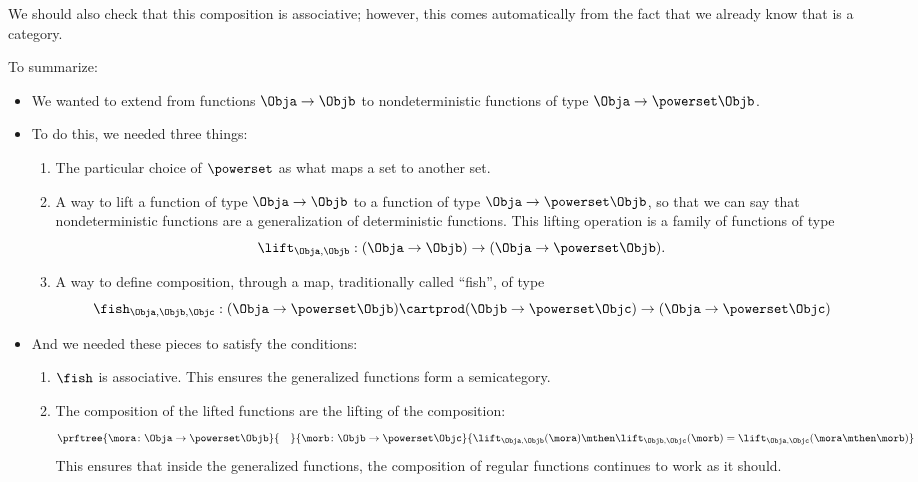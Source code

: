 We should also check that this composition is associative; however, this comes automatically from the fact that we already know that \Rel is a category.

To summarize:
\begin{itemize}
    \item We wanted to extend \Set from functions $\Obja \to \Objb$ to nondeterministic functions of type $\Obja \to \powerset\Objb$.
    \item To do this, we needed three things:
          \begin{enumerate}
              \item The particular choice of $\powerset$ as what maps a set to another set.
              \item A way to lift a function of type $\Obja \to \Objb$ to a function of type $\Obja \to \powerset\Objb$, so that we can say that nondeterministic functions are a generalization of deterministic functions.
                    This lifting operation is a family of functions of type
                    \begin{equation}
                        \label{eq:monad-lift}
                        \lift_{\Obja, \Objb}: (\Obja \to \Objb) \to (\Obja \to \powerset\Objb).
                    \end{equation}
              \item A way to define composition, through a map, traditionally called ``fish'', of type
                    \begin{equation}
                        \label{eq:monad-fish}
                        \fish_{\Obja, \Objb, \Objc}: (\Obja \to \powerset\Objb) \cartprod (\Objb \to \powerset\Objc)
                        \to (\Obja \to \powerset \Objc)
                    \end{equation}
          \end{enumerate}
    \item And we needed these pieces to satisfy the conditions:
          \begin{enumerate}
              \item $\fish$ is associative.
                    This ensures the generalized functions form a semicategory.
              \item The composition of the lifted functions are the lifting of the composition:
                    \begin{equation}
                        \label{eq:monad-fish-associative}
                        \prftree{\mora\colon \Obja \to \powerset\Objb}{\quad}{\morb\colon \Objb \to \powerset \Objc}{
                            \lift_{\Obja,\Objb}(\mora)\mthen\lift_{\Objb,\Objc}(\morb) =  \lift_{\Obja,\Objc}(\mora\mthen\morb)}
                    \end{equation}
                    This ensures that inside the generalized functions, the composition of regular functions continues to work as it should.
          \end{enumerate}
\end{itemize}


